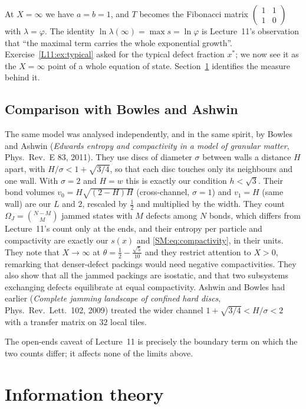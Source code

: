 At $X=\infty$ we have $a=b=1$, and $T$ becomes the Fibonacci matrix $\left(\begin{smallmatrix}1&1\\1&0\end{smallmatrix}\right)$ with
$\lambda=\varphi$. The identity $\ln\lambda(\infty)=\max s=\ln\varphi$ is Lecture~11's observation that ``the
maximal term carries the whole exponential growth''. Exercise~\ref{L11:ex:typical} asked for the
typical defect fraction $x^*$; we now see it as the $X=\infty$ point of a whole equation of state. Section~\ref{SM:sec:info}
identifies the measure behind it.

\subsection{Comparison with Bowles and Ashwin}

The same model was analysed independently, and in the same spirit, by Bowles and Ashwin (\emph{Edwards
entropy and compactivity in a model of granular matter}, Phys.\ Rev.~E 83, 2011). They use discs of
diameter $\sigma$ between walls a distance $H$ apart, with $H/\sigma<1+\sqrt{3/4}$, so that each disc
touches only its neighbours and one wall. With $\sigma=2$ and $H=w$ this is exactly our condition
$h<\sqrt3$. Their bond volumes $v_0=H\sqrt{(2-H)H}$ (cross-channel, $\sigma=1$) and $v_1=H$
(same wall) are our $L$ and $2$, rescaled by $\frac12$ and multiplied by the width. They count
$\Omega_J=\binom{N-M}{M}$ jammed states with $M$ defects among $N$ bonds, which differs from Lecture~11's
count only at the ends, and their entropy per particle and compactivity are exactly our $s(x)$ and
\eqref{SM:eq:compactivity}, in their units. They note that $X\to\infty$ at
$\theta=\frac12-\frac{\sqrt5}{10}$ and they restrict attention to $X>0$, remarking that denser-defect
packings would need negative compactivities. They also show that all the jammed packings are isostatic,
and that two subsystems exchanging defects equilibrate at equal compactivity. Ashwin and Bowles had
earlier (\emph{Complete jamming landscape of confined hard discs}, Phys.\ Rev.\ Lett.\ 102, 2009) treated the wider channel $1+\sqrt{3/4}<H/\sigma<2$ with a transfer
matrix on $32$ local tiles.

The open-ends caveat of Lecture~11 is precisely the boundary term on which the two counts differ; it
affects none of the limits above.

\section{Information theory}
\label{SM:sec:info}

